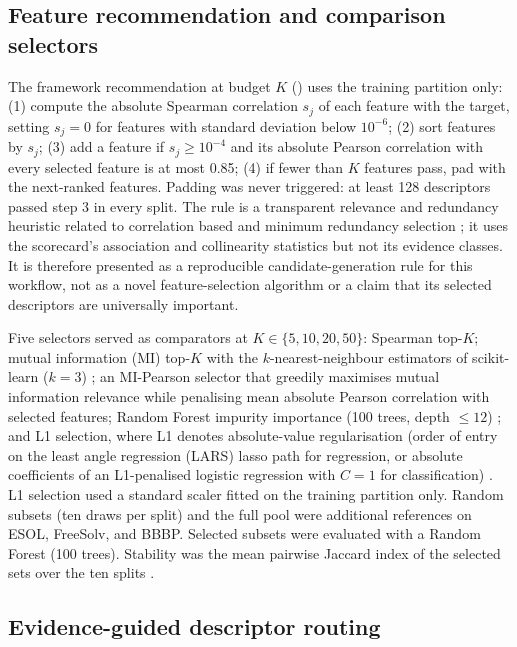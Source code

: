 \subsection{Feature recommendation and comparison selectors}\label{subsec:selectors}

The framework recommendation at budget $K$ () uses the training partition only: (1) compute the absolute Spearman correlation $s_j$ of each feature with the target, setting $s_j=0$ for features with standard deviation below $10^{-6}$; (2) sort features by $s_j$; (3) add a feature if $s_j\geq10^{-4}$ and its absolute Pearson correlation with every selected feature is at most 0.85; (4) if fewer than $K$ features pass, pad with the next-ranked features. Padding was never triggered: at least 128 descriptors passed step 3 in every split. The rule is a transparent relevance and redundancy heuristic related to correlation based and minimum redundancy selection \cite{hall1999cfs,peng2005mrmr}; it uses the scorecard's association and collinearity statistics but not its evidence classes. It is therefore presented as a reproducible candidate-generation rule for this workflow, not as a novel feature-selection algorithm or a claim that its selected descriptors are universally important.

Five selectors served as comparators at $K\in\{5,10,20,50\}$: Spearman top-$K$; mutual information (MI) top-$K$ with the $k$-nearest-neighbour estimators of scikit-learn ($k=3$) \cite{kraskov2004mi,ross2014mi}; an MI-Pearson selector that greedily maximises mutual information relevance while penalising mean absolute Pearson correlation with selected features; Random Forest impurity importance (100 trees, depth $\leq12$) \cite{breiman2001rf}; and L1 selection, where L1 denotes absolute-value regularisation (order of entry on the least angle regression (LARS) lasso path for regression, or absolute coefficients of an L1-penalised logistic regression with $C=1$ for classification) \cite{tibshirani1996lasso,efron2004lars}. L1 selection used a standard scaler fitted on the training partition only. Random subsets (ten draws per split) and the full pool were additional references on ESOL, FreeSolv, and BBBP. Selected subsets were evaluated with a Random Forest (100 trees). Stability was the mean pairwise Jaccard index of the selected sets over the ten splits \cite{kalousis2007stability,nogueira2018stability}.

\subsection{Evidence-guided descriptor routing}\label{subsec:routing}

